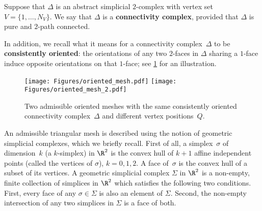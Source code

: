 \begin{definition}
	\label{definition:connectivity_complex}
	Suppose that $\Delta$ is an abstract simplicial $2$-complex with vertex set~$V = \{1, \ldots, N_V\}$.
	We say that $\Delta$ is a \textbf{connectivity complex}, provided that $\Delta$ is pure and $2$-path connected.
\end{definition}

In addition, we recall what it means for a connectivity complex~$\Delta$ to be \textbf{consistently oriented}: the orientations of any two $2$-faces in $\Delta$ sharing a $1$-face induce opposite orientations on that $1$-face; see \cref{fig:points_in_plusmanifold} for an illustration.

\begin{figure}[htp]
	\centering
	\texttt{[image: Figures/oriented\_mesh.pdf]}
	\qquad
	\texttt{[image: Figures/oriented\_mesh\_2.pdf]}
	\caption{Two admissible oriented meshes with the same consistently oriented connectivity complex~$\Delta$ and different vertex positions~$Q$.}
	\label{fig:points_in_plusmanifold}
\end{figure}

An admissible triangular mesh is described using the notion of geometric simplicial complexes, which we briefly recall.
First of all, a simplex~$\sigma$ of dimension~$k$ (a $k$-simplex) in $\R^2$ is the convex hull of $k+1$ affine independent points (called the vertices of $\sigma$), $k = 0,1,2$.
A face of~$\sigma$ is the convex hull of a subset of its vertices.
A geometric simplicial complex $\Sigma$ in $\R^2$ is a non-empty, finite collection of simplices in $\R^2$ which satisfies the following two conditions.
First, every face of any $\sigma \in \Sigma$ is also an element of $\Sigma$.
Second, the non-empty intersection of any two simplices in $\Sigma$ is a face of both.

